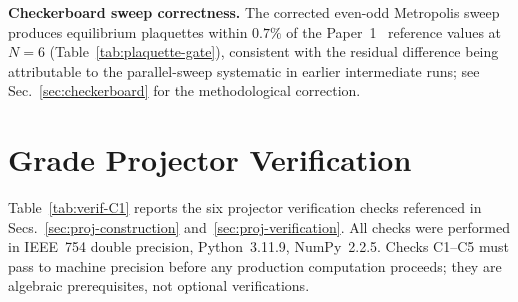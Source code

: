 \documentclass[12pt]{article}
\theoremstyle{definition}
\theoremstyle{remark}
\begin{document}
	\noindent\textbf{Checkerboard sweep correctness.}\enspace
	The corrected even-odd Metropolis sweep produces equilibrium plaquettes
	within $0.7\%$ of the Paper~1~\cite{FirestoneP1} reference values at $N=6$
	(Table~\ref{tab:plaquette-gate}), consistent with the residual difference
	being attributable to the parallel-sweep systematic in earlier intermediate
	runs; see Sec.~\ref{sec:checkerboard} for the methodological correction.
	
	\section{Grade Projector Verification}
	\label{app:C}
	
	Table~\ref{tab:verif-C1} reports the six projector verification checks
	referenced in Secs.~\ref{sec:proj-construction}
	and~\ref{sec:proj-verification}.  All checks were performed in IEEE~754
	double precision, Python~3.11.9, NumPy~2.2.5.  Checks C1--C5 must pass
	to machine precision before any production computation proceeds; they are
	algebraic prerequisites, not optional verifications.
	
\end{document}

